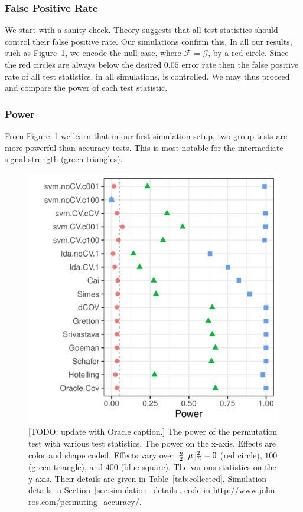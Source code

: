 \documentclass[]{bio}
\begin{document}
\subsubsection{False Positive Rate}
\label{sec:type_i}

We start with a sanity check. 
Theory suggests that all test statistics should control their false positive rate. 
Our simulations confirm this.
In all our results, such as Figure~\ref{fig:simulation_1}, we encode the null case, where $\mathcal{F}=\mathcal{G}$, by a red circle. 
Since the red circles are always below the desired $0.05$ error rate then the false positive rate of all test statistics, in all simulations, is controlled. 
We may thus proceed and compare the power of each test statistic. 






\subsubsection{Power}
\label{sec:power}

From Figure~\ref{fig:simulation_1} we learn that in our first simulation setup, two-group tests are more powerful than accuracy-tests.
This is most notable for the intermediate signal strength (green triangles). 

\begin{figure}[h]
	\centering
	\includegraphics[width=0.5\columnwidth]{"art/file2"}
	\caption{
		[TODO: update with Oracle caption.]
		The power of the permutation test with various test statistics. 
		The power on the x-axis. 
		Effects are color and shape coded. 
		Effects vary over $\frac{n}{2}\Vert \mu \Vert^2_\Sigma=0$ (red circle), $100$ (green triangle), and $400$ (blue square). 
		The various statistics on the y-axis. 
		Their details are given in Table~\ref{tab:collected}. 
		Simulation details in Section~\ref{sec:simulation_details}.
		\R code in \url{http://www.john-ros.com/permuting_accuracy/}.}	
	\label{fig:simulation_1}
\end{figure}
\end{document}

